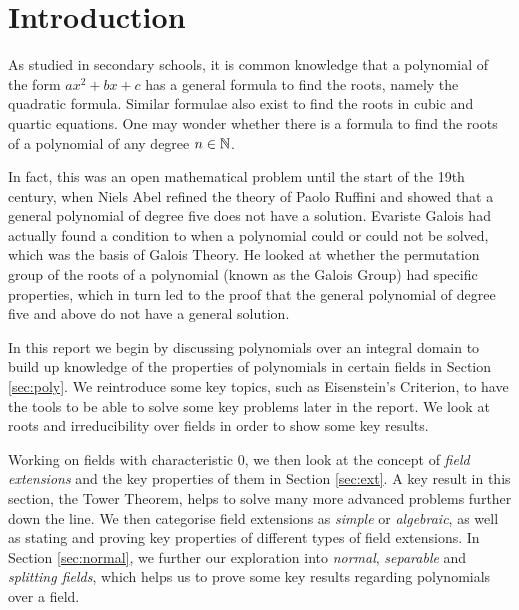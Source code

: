 
\section{Introduction}

As studied in secondary schools, it is common knowledge that a polynomial of the form $ax^2+bx+c$ has a general formula to find the roots, namely the quadratic formula. Similar formulae also exist to find the roots in cubic and quartic equations. One may wonder whether there is a formula to find the roots of a polynomial of any degree $n \in \mathbb N$.

In fact, this was an open mathematical problem until the start of the 19th century, when Niels Abel refined the theory of Paolo Ruffini and showed that a general polynomial of degree five does not have a solution. Evariste Galois had actually found a condition to when a polynomial could or could not be solved, which was the basis of Galois Theory. He looked at whether the permutation group of the roots of a polynomial (known as the Galois Group) had specific properties, which in turn led to the proof that the general polynomial of degree five and above do not have a general solution.

In this report we begin by discussing polynomials over an integral domain to build up knowledge of the properties of polynomials in certain fields in Section \ref{sec:poly}. We reintroduce some key topics, such as Eisenstein’s Criterion, to have the tools to be able to solve some key problems later in the report. We look at roots and irreducibility over fields in order to show some key results.

Working on fields with characteristic $0$, we then look at the concept of \textit{field extensions} and the key properties of them in Section \ref{sec:ext}. A key result in this section, the Tower Theorem, helps to solve many more advanced problems further down the line. We then categorise field extensions as \textit{simple} or \textit{algebraic}, as well as stating and proving key properties of different types of field extensions. In Section \ref{sec:normal}, we further our exploration into \textit{normal}, \textit{separable} and \textit{splitting fields}, which helps us to prove some key results regarding polynomials over a field.

